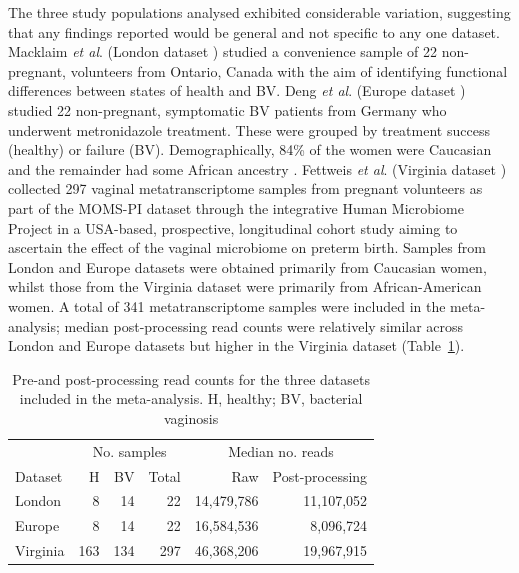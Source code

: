 \documentclass[sn-mathphys,Numbered]{sn-jnl}%
\begin{document}
The three study populations analysed exhibited considerable variation, suggesting that any findings reported would be general and not specific to any one dataset. Macklaim \textit{et al}. (London dataset \cite{Macklaim:2018aa}) studied a convenience sample of 22 non-pregnant, volunteers from Ontario, Canada with the aim of identifying functional differences between states of health and BV. Deng \textit{et al}. (Europe dataset \cite{Denge00262-18}) studied 22 non-pregnant, symptomatic BV patients from Germany who underwent metronidazole treatment. These were grouped by treatment success (healthy) or failure (BV). Demographically, 84\% of the women were Caucasian and the remainder had some African ancestry \cite{Gottschick:2017aa}. Fettweis \textit{et al}. (Virginia dataset \cite{Fettweis:2019aa}) collected 297 vaginal metatranscriptome samples from pregnant volunteers as part of the MOMS-PI dataset through the integrative Human Microbiome Project in a USA-based, prospective, longitudinal cohort study aiming to ascertain the effect of the vaginal microbiome on preterm birth. Samples from London and Europe datasets were obtained primarily from Caucasian women, whilst those from the Virginia dataset were primarily from African-American women. A total of 341 metatranscriptome samples were included in the meta-analysis; median post-processing read counts were relatively similar across London and Europe datasets but higher in the Virginia dataset (Table~\ref{tab:tabReadCounts}).

\begin{table}[h]
    \centering
    \caption{Pre-and post-processing read counts for the three datasets included in the meta-analysis. H, healthy; BV, bacterial vaginosis} \label{tab:tabReadCounts}
    \begin{tabular}{lrrrrr}
        \toprule
        & \multicolumn{3}{c}{No. samples} & \multicolumn{2}{c}{Median no. reads}\\
        \cmidrule(lr){2-4} \cmidrule(lr){5-6}
        Dataset & H & BV & Total & Raw & Post-processing\\
        \midrule
        London \cite{Macklaim:2018aa} & 8 & 14 & 22 & 14,479,786 & 11,107,052\\
        Europe \cite{Denge00262-18} & 8 & 14 & 22 & 16,584,536 & 8,096,724\\
        Virginia \cite{Fettweis:2019aa} & 163 & 134 & 297 & 46,368,206 & 19,967,915\\
        \bottomrule
    \end{tabular}
\end{table}
\end{document}
